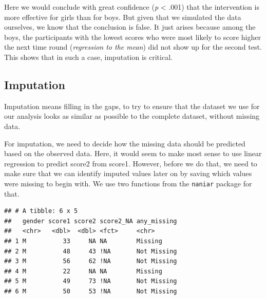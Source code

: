 \documentclass[
]{book}
\newenvironment{Shaded}{\begin{snugshade}}{\end{snugshade}}
\newcommand{\DataTypeTok}[1]{\textcolor[rgb]{0.13,0.29,0.53}{#1}}
\newcommand{\KeywordTok}[1]{\textcolor[rgb]{0.13,0.29,0.53}{\textbf{#1}}}
\newcommand{\NormalTok}[1]{#1}
\newcommand{\OperatorTok}[1]{\textcolor[rgb]{0.81,0.36,0.00}{\textbf{#1}}}
\newcommand{\OtherTok}[1]{\textcolor[rgb]{0.56,0.35,0.01}{#1}}
\newcommand{\StringTok}[1]{\textcolor[rgb]{0.31,0.60,0.02}{#1}}
\begin{document}
Here we would conclude with great confidence (\emph{p} \textless{} .001) that the intervention is more effective for girls than for boys. But given that we simulated the data ourselves, we know that the conclusion is false. It just arises because among the boys, the participants with the lowest scores who were most likely to score higher the next time round (\emph{regression to the mean}) did not show up for the second test. This shows that in such a case, imputation is critical.

\hypertarget{imputation}{%
\subsection{Imputation}\label{imputation}}

Imputation means filling in the gaps, to try to ensure that the dataset we use for our analysis looks as similar as possible to the complete dataset, without missing data.

For imputation, we need to decide how the missing data should be predicted based on the observed data. Here, it would seem to make most sense to use linear regression to predict score2 from score1. However, before we do that, we need to make sure that we can identify imputed values later on by saving which values were missing to begin with. We use two functions from the \texttt{naniar} package for that.

\begin{Shaded}
\end{Shaded}

\begin{verbatim}
## # A tibble: 6 x 5
##   gender score1 score2 score2_NA any_missing
##   <chr>   <dbl>  <dbl> <fct>     <chr>      
## 1 M          33     NA NA        Missing    
## 2 M          48     43 !NA       Not Missing
## 3 M          56     62 !NA       Not Missing
## 4 M          22     NA NA        Missing    
## 5 M          49     73 !NA       Not Missing
## 6 M          50     53 !NA       Not Missing
\end{verbatim}
\end{document}
